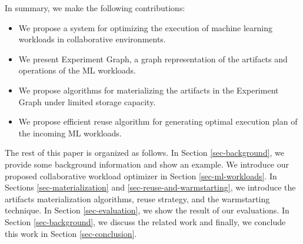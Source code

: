 In summary, we make the following contributions:
\begin{itemize}
\item We propose a system for optimizing the execution of machine learning workloads in collaborative environments.
\item We present Experiment Graph, a graph representation of the artifacts and operations of the ML workloads.
\item We propose algorithms for materializing the artifacts in the Experiment Graph under limited storage capacity.
\item We propose efficient reuse algorithm for generating optimal execution plan of the incoming ML workloads.
\end{itemize}

The rest of this paper is organized as follows.
In Section \ref{sec-background}, we provide some background information and show an example.
We introduce our proposed collaborative workload optimizer in Section \ref{sec-ml-workloads}.
In Sections \ref{sec-materialization} and \ref{sec-reuse-and-warmstarting}, we introduce the artifacts materialization algorithms, reuse strategy, and the warmstarting technique. 
In Section \ref{sec-evaluation}, we show the result of our evaluations.
In Section \ref{sec-background}, we discuss the related work and finally, we conclude this work in Section \ref{sec-conclusion}.